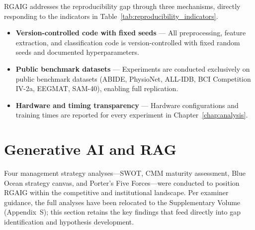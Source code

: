 RGAIG addresses the reproducibility gap through three mechanisms, directly responding to the indicators in Table~\ref{tab:reproducibility_indicators}.

\begin{itemize}[leftmargin=*, itemsep=3pt]
  \item \textbf{Version-controlled code with fixed seeds} --- All preprocessing, feature extraction, and classification code is version-controlled with fixed random seeds and documented hyperparameters.
  \item \textbf{Public benchmark datasets} --- Experiments are conducted exclusively on public benchmark datasets (ABIDE, PhysioNet, ALL-IDB, BCI Competition IV-2a, EEGMAT, SAM-40), enabling full replication.
  \item \textbf{Hardware and timing transparency} --- Hardware configurations and training times are reported for every experiment in Chapter~\ref{chap:analysis}.
\end{itemize}
\fi %

\section{Generative AI and RAG}

Four management strategy analyses---SWOT, CMM maturity assessment, Blue Ocean strategy canvas, and Porter's Five Forces---were conducted to position RGAIG within the competitive and institutional landscape. Per examiner guidance, the full analyses have been relocated to the Supplementary Volume (Appendix~S); this section retains the key findings that feed directly into gap identification and hypothesis development.

%


